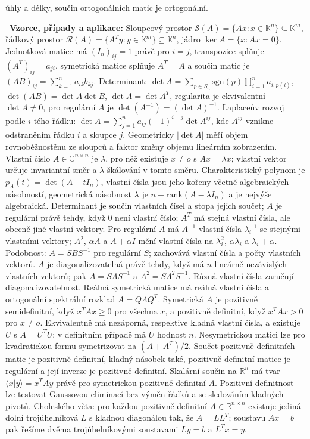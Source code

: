 \begin{odpoved}
úhly a délky, součin ortogonálních matic je ortogonální.\par
\noindent{}\ \textbf{Vzorce, případy a aplikace:} Sloupcový prostor
$\mathcal S(A)=\{Ax:x\in\mathbb K^n\}\subseteq\mathbb K^m$, řádkový prostor
$\mathcal R(A)=\{A^Ty:y\in\mathbb K^m\}\subseteq\mathbb K^n$, jádro
$\ker A=\{x:Ax=0\}$. Jednotková matice má $(I_n)_{ij}=1$ právě pro $i=j$,
transpozice splňuje $(A^T)_{ij}=a_{ji}$, symetrická matice splňuje $A^T=A$ a
součin matic je $(AB)_{ij}=\sum_{k=1}^n a_{ik}b_{kj}$. Determinant:
$\det A=\sum_{p\in S_n}\mathrm{sgn}(p)\prod_{i=1}^n a_{i,p(i)}$,
$\det(AB)=\det A\det B$, $\det A=\det A^T$, regularita je ekvivalentní
$\det A\ne0$, pro regulární $A$ je $\det(A^{-1})=(\det A)^{-1}$. Laplaceův rozvoj
podle $i$-tého řádku: $\det A=\sum_{j=1}^n a_{ij}(-1)^{i+j}\det A^{ij}$, kde
$A^{ij}$ vznikne odstraněním řádku $i$ a sloupce $j$. Geometricky $|\det A|$ měří
objem rovnoběžnostěnu ze sloupců a faktor změny objemu lineárním zobrazením. Vlastní
číslo $A\in\mathbb C^{n\times n}$ je $\lambda$, pro něž existuje $x\ne o$ s
$Ax=\lambda x$; vlastní vektor určuje invariantní směr a $\lambda$ škálování v tomto
směru. Charakteristický polynom je $p_A(t)=\det(A-tI_n)$, vlastní čísla jsou jeho
kořeny včetně algebraických násobností, geometrická násobnost $\lambda$ je
$n-\mathrm{rank}(A-\lambda I_n)$ a je nejvýše algebraická. Determinant je součin
vlastních čísel a stopa jejich součet; $A$ je regulární právě tehdy, když $0$ není
vlastní číslo; $A^T$ má stejná vlastní čísla, ale obecně jiné vlastní vektory. Pro
regulární $A$ má $A^{-1}$ vlastní čísla $\lambda_i^{-1}$ se stejnými vlastními vektory;
$A^2$, $\alpha A$ a $A+\alpha I$ mění vlastní čísla na $\lambda_i^2$, $\alpha\lambda_i$
a $\lambda_i+\alpha$. Podobnost: $A=SBS^{-1}$ pro regulární $S$; zachovává vlastní
čísla a počty vlastních vektorů. $A$ je diagonalizovatelná právě tehdy, když má $n$
lineárně nezávislých vlastních vektorů; pak $A=S\Lambda S^{-1}$ a $A^2=S\Lambda^2S^{-1}$.
Různá vlastní čísla zaručují diagonalizovatelnost. Reálná symetrická matice má reálná
vlastní čísla a ortogonální spektrální rozklad $A=Q\Lambda Q^T$. Symetrická $A$ je
pozitivně semidefinitní, když $x^TAx\ge0$ pro všechna $x$, a pozitivně definitní, když
$x^TAx>0$ pro $x\ne o$. Ekvivalentně má nezáporná, respektive kladná vlastní čísla,
a existuje $U$ s $A=U^TU$; v definitním případě má $U$ hodnost $n$. Nesymetrickou matici
lze pro kvadratickou formu symetrizovat na $(A+A^T)/2$. Součet pozitivně definitních
matic je pozitivně definitní, kladný násobek také, pozitivně definitní matice je regulární
a její inverze je pozitivně definitní. Skalární součin na $\mathbb R^n$ má tvar
$\langle x|y\rangle=x^TAy$ právě pro symetrickou pozitivně definitní $A$. Pozitivní definitnost lze
testovat Gaussovou eliminací bez výměn řádků a se sledováním kladných pivotů. Choleského
věta: pro každou pozitivně definitní $A\in\mathbb R^{n\times n}$ existuje jediná dolní
trojúhelníková $L$ s kladnou diagonálou tak, že $A=LL^T$; soustavu $Ax=b$ pak řešíme
dvěma trojúhelníkovými soustavami $Ly=b$ a $L^Tx=y$.
\end{odpoved}
